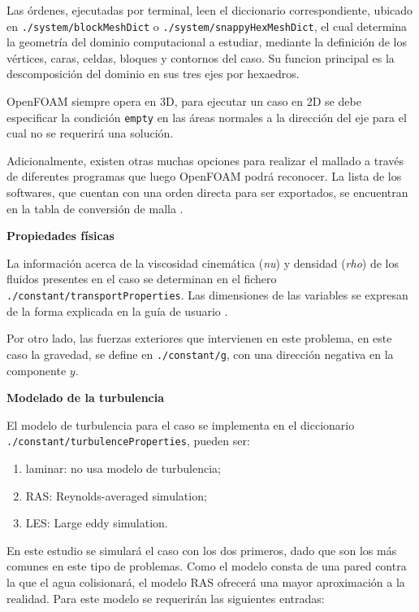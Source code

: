 Las órdenes, ejecutadas por terminal, leen el diccionario
correspondiente, ubicado en
\lstinline[style=bash]{./system/blockMeshDict} o
\lstinline[style=bash]{./system/snappyHexMeshDict}, el cual determina
la geometría del dominio computacional a estudiar, mediante la
definición de los vértices, caras, celdas, bloques y contornos del caso.
Su funcion principal es la descomposición del dominio en sus tres ejes
por hexaedros.

OpenFOAM siempre opera en 3D, para ejecutar un caso en 2D se debe
especificar la condición \texttt{empty} en las áreas normales a la
dirección del eje para el cual no se requerirá una solución.

Adicionalmente, existen otras muchas opciones para realizar el mallado a
través de diferentes programas que luego OpenFOAM podrá reconocer. La
lista de los softwares, que cuentan con una orden directa para ser
exportados, se encuentran en la tabla de
conversión de malla \cite{conversion}.

\textbf{Propiedades físicas}

La información acerca de la viscosidad cinemática (\emph{nu}) y densidad
(\emph{rho}) de los fluidos presentes en el caso se determinan en el
fichero \lstinline[style=bash]{./constant/transportProperties}. Las
dimensiones de las variables se expresan de la forma explicada en la guía de usuario \cite{guideDimensions}.

Por otro lado, las fuerzas exteriores que intervienen en este problema,
en este caso la gravedad, se define en
\lstinline[style=bash]{./constant/g}, con una dirección negativa en la
componente $y$.

\textbf{Modelado de la turbulencia}

El modelo de turbulencia para el caso se implementa en el diccionario
\lstinline[style=bash]{./constant/turbulenceProperties}, pueden ser:

\begin{enumerate}
\def\labelenumi{\arabic{enumi}.}
\item
  laminar: no usa modelo de turbulencia;
\item
  RAS: Reynolds-averaged simulation;
\item
  LES: Large eddy simulation.
\end{enumerate}

En este estudio se simulará el caso con los dos primeros, dado que son
los más comunes en este tipo de problemas. Como el modelo consta de una
pared contra la que el agua colisionará, el modelo RAS ofrecerá una
mayor aproximación a la realidad. Para este modelo se requerirán las
siguientes entradas:

